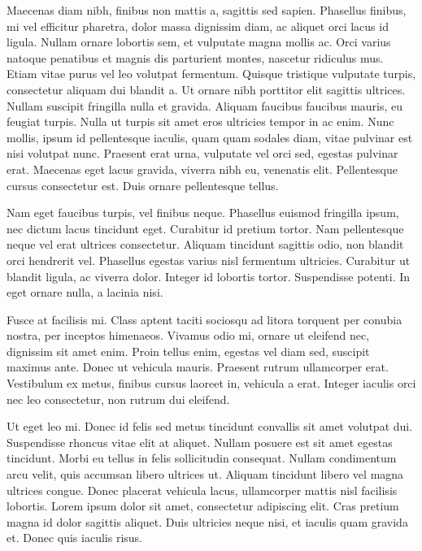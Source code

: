 Maecenas diam nibh, finibus non mattis a, sagittis sed sapien. Phasellus
finibus, mi vel efficitur pharetra, dolor massa dignissim diam, ac aliquet orci
lacus id ligula. Nullam ornare lobortis sem, et vulputate magna mollis ac. Orci
varius natoque penatibus et magnis dis parturient montes, nascetur ridiculus
mus. Etiam vitae purus vel leo volutpat fermentum. Quisque tristique vulputate
turpis, consectetur aliquam dui blandit a. Ut ornare nibh porttitor elit
sagittis ultrices. Nullam suscipit fringilla nulla et gravida. Aliquam faucibus
faucibus mauris, eu feugiat turpis. Nulla ut turpis sit amet eros ultricies
tempor in ac enim. Nunc mollis, ipsum id pellentesque iaculis, quam quam
sodales diam, vitae pulvinar est nisi volutpat nunc. Praesent erat urna,
vulputate vel orci sed, egestas pulvinar erat. Maecenas eget lacus gravida,
viverra nibh eu, venenatis elit. Pellentesque cursus consectetur est. Duis
ornare pellentesque tellus.

Nam eget faucibus turpis, vel finibus neque. Phasellus euismod fringilla ipsum,
nec dictum lacus tincidunt eget. Curabitur id pretium tortor. Nam pellentesque
neque vel erat ultrices consectetur. Aliquam tincidunt sagittis odio, non
blandit orci hendrerit vel. Phasellus egestas varius nisl fermentum ultricies.
Curabitur ut blandit ligula, ac viverra dolor. Integer id lobortis tortor.
Suspendisse potenti. In eget ornare nulla, a lacinia nisi.

Fusce at facilisis mi. Class aptent taciti sociosqu ad litora torquent per
conubia nostra, per inceptos himenaeos. Vivamus odio mi, ornare ut eleifend
nec, dignissim sit amet enim. Proin tellus enim, egestas vel diam sed, suscipit
maximus ante. Donec ut vehicula mauris. Praesent rutrum ullamcorper erat.
Vestibulum ex metus, finibus cursus laoreet in, vehicula a erat. Integer
iaculis orci nec leo consectetur, non rutrum dui eleifend.

Ut eget leo mi. Donec id felis sed metus tincidunt convallis sit amet volutpat
dui. Suspendisse rhoncus vitae elit at aliquet. Nullam posuere est sit amet
egestas tincidunt. Morbi eu tellus in felis sollicitudin consequat. Nullam
condimentum arcu velit, quis accumsan libero ultrices ut. Aliquam tincidunt
libero vel magna ultrices congue. Donec placerat vehicula lacus, ullamcorper
mattis nisl facilisis lobortis. Lorem ipsum dolor sit amet, consectetur
adipiscing elit. Cras pretium magna id dolor sagittis aliquet. Duis ultricies
neque nisi, et iaculis quam gravida et. Donec quis iaculis risus.

